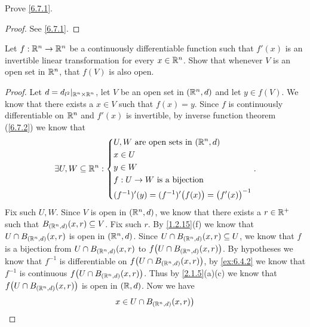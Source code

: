 \begin{ex}\label{ex:6.7.2}
  Prove \cref{6.7.1}.
\end{ex}

\begin{proof}
  See \cref{6.7.1}.
\end{proof}

\begin{ex}\label{ex:6.7.3}
  Let \(f : \mathbb{R}^n \to \mathbb{R}^n\) be a continuously differentiable function such that \(f'(x)\) is an invertible linear transformation for every \(x \in \mathbb{R}^n\).
  Show that whenever \(V\) is an open set in \(\mathbb{R}^n\), that \(f(V)\) is also open.
\end{ex}

\begin{proof}
  Let \(d = d_{l^2}|_{\mathbb{R}^n \times \mathbb{R}^n}\), let \(V\) be an open set in \((\mathbb{R}^n, d)\) and let \(y \in f(V)\).
  We know that there exists a \(x \in V\) such that \(f(x) = y\).
  Since \(f\) is continuously differentiable on \(\mathbb{R}^n\) and \(f'(x)\) is invertible, by inverse function theorem (\cref{6.7.2}) we know that
  \[
    \exists U, W \subseteq \mathbb{R}^n : \begin{dcases}
      U, W \text{ are open sets in } (\mathbb{R}^n, d) \\
      x \in U                                  \\
      y \in W                                  \\
      f : U \to W \text{ is a bijection}       \\
      (f^{-1})'(y) = (f^{-1})'\big(f(x)\big) = \big(f'(x)\big)^{-1}
    \end{dcases}.
  \]
  Fix such \(U, W\).
  Since \(V\) is open in \((\mathbb{R}^n, d)\), we know that there exists a \(r \in \mathbb{R}^+\) such that \(B_{(\mathbb{R}^n, d)}(x, r) \subseteq V\).
  Fix such \(r\).
  By \cref{1.2.15}(f) we know that \(U \cap B_{(\mathbb{R}^n, d)}(x, r)\) is open in \((\mathbb{R}^n, d)\).
  Since \(U \cap B_{(\mathbb{R}^n, d)}(x, r) \subseteq U\), we know that \(f\) is a bijection from \(U \cap B_{(\mathbb{R}^n, d)}(x, r)\) to \(f\big(U \cap B_{(\mathbb{R}^n, d)}(x, r)\big)\).
  By hypotheses we know that \(f^{-1}\) is differentiable on \(f\big(U \cap B_{(\mathbb{R}^n, d)}(x, r)\big)\), by \cref{ex:6.4.2} we know that \(f^{-1}\) is continuous \(f\big(U \cap B_{(\mathbb{R}^n, d)}(x, r)\big)\).
  Thus by \cref{2.1.5}(a)(c) we know that \(f\big(U \cap B_{(\mathbb{R}^n, d)}(x, r)\big)\) is open in \((\mathbb{R}, d)\).
  Now we have
  \begin{align*}
             & x \in U \cap B_{(\R^n, d)}(x, r)\big)                                                                                                                                \\

\end{align*}
\end{proof}
